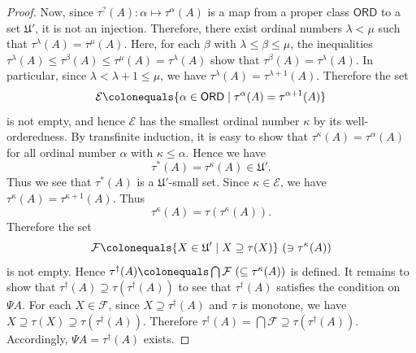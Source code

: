 \documentclass{surv-l}
\numberwithin{equation}{chapter}
\numberwithin{figure}{chapter}
\theoremstyle{plain}
\theoremstyle{definition}
\theoremstyle{remark}
\begin{document}
\begin{proof}
Now, since $\tau^?(A)\colon \alpha \mapsto \tau^{\alpha}(A)$ is a map from a proper class $\mathsf{ORD}$ to a set $\mathfrak{U}'$,
it is not an injection.
Therefore, there exist ordinal numbers $\lambda < \mu$ such that $\tau^\lambda(A) = \tau^\mu(A)$.
Here, for each $\beta$ with $\lambda \le \beta \le \mu$, the inequalities
$\tau^\lambda(A) \le \tau^\beta(A) \le \tau^\mu(A) = \tau^\lambda(A)$ show that
$\tau^\beta(A) = \tau^\lambda(A)$.
In particular, since $\lambda < \lambda+1 \le \mu$, we have
$\tau^\lambda(A) = \tau^{\lambda+1}(A)$.
Therefore the set
\[
\mathcal{E}\colonequals  \{\alpha \in \mathsf{ORD} \mid \tau^\alpha(A) = \tau^{\alpha+1}(A)\}
\]
is not empty, and hence $\mathcal{E}$ has the smallest ordinal number $\kappa$
by its well-orderedness. By transfinite induction, it is easy to show that $\tau^\kappa(A) = \tau^\alpha(A)$
for all ordinal number $\alpha$ with $\kappa \le \alpha$.
Hence we have
\[
\tau^*(A) = \tau^\kappa(A) \in \mathfrak{U}'.
\]
Thus we see that $\tau^*(A)$ is a $\mathfrak{U}'$-small set.
Since $\kappa \in \mathcal{E}$, we have $\tau^\kappa(A) = \tau^{\kappa+1}(A)$.
Thus
\begin{equation}\label{eq:ta-ka}
\tau^\kappa(A) = \tau(\tau^\kappa(A)).
\end{equation}
Therefore the set
\[
\mathcal{F}\colonequals  \{X \in \mathfrak{U}' \mid X \supseteq \tau(X)\} \ (\ni \tau^\kappa(A))
\]
is not empty.
Hence $\tau^\dagger(A)\colonequals  \bigcap \mathcal{F}\ (\subseteq \tau^\kappa(A))$ is defined.
It remains to show that $\tau^\dagger(A) \supseteq \tau(\tau^\dagger(A))$
to see that $\tau^\dagger(A)$ satisfies the condition on $\Psi A$.
For each $X \in \mathcal{F}$, since $X \supseteq \tau^\dagger(A)$ and $\tau$ is monotone,
we have $X \supseteq \tau(X) \supseteq \tau(\tau^\dagger(A))$.
Therefore $\tau^\dagger(A) = \bigcap \mathcal{F} \supseteq \tau(\tau^\dagger(A))$.
Accordingly, $\Psi A = \tau^\dagger(A)$ exists.
\end{proof}
\end{document}
